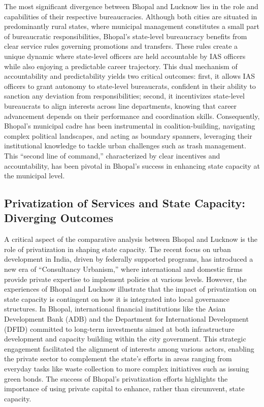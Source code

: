 The most significant divergence between Bhopal and Lucknow lies in the role and capabilities of their respective bureaucracies. Although both cities are situated in predominantly rural states, where municipal management constitutes a small part of bureaucratic responsibilities, Bhopal's state-level bureaucracy benefits from clear service rules governing promotions and transfers. These rules create a unique dynamic where state-level officers are held accountable by IAS officers while also enjoying a predictable career trajectory. This dual mechanism of accountability and predictability yields two critical outcomes: first, it allows IAS officers to grant autonomy to state-level bureaucrats, confident in their ability to sanction any deviation from responsibilities; second, it incentivizes state-level bureaucrats to align interests across line departments, knowing that career advancement depends on their performance and coordination skills. Consequently, Bhopal's municipal cadre has been instrumental in coalition-building, navigating complex political landscapes, and acting as boundary spanners, leveraging their institutional knowledge to tackle urban challenges such as trash management. This ``second line of command,'' characterized by clear incentives and accountability, has been pivotal in Bhopal's success in enhancing state capacity at the municipal level.

\subsection{Privatization of Services and State Capacity: Diverging Outcomes}

A critical aspect of the comparative analysis between Bhopal and Lucknow is the role of privatization in shaping state capacity. The recent focus on urban development in India, driven by federally supported programs, has introduced a new era of ``Consultancy Urbanism,'' where international and domestic firms provide private expertise to implement policies at various levels. However, the experiences of Bhopal and Lucknow illustrate that the impact of privatization on state capacity is contingent on how it is integrated into local governance structures. In Bhopal, international financial institutions like the Asian Development Bank (ADB) and the Department for International Development (DFID) committed to long-term investments aimed at both infrastructure development and capacity building within the city government. This strategic engagement facilitated the alignment of interests among various actors, enabling the private sector to complement the state's efforts in areas ranging from everyday tasks like waste collection to more complex initiatives such as issuing green bonds. The success of Bhopal's privatization efforts highlights the importance of using private capital to enhance, rather than circumvent, state capacity.

